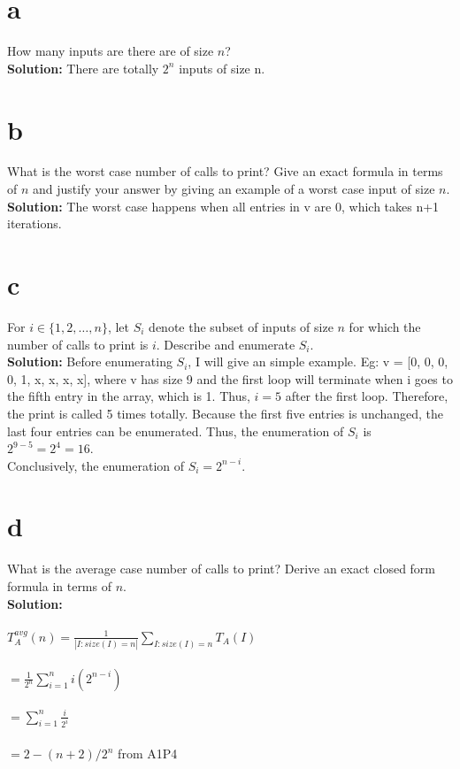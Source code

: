 \documentclass[12pt]{article}
\begin{document}
\begin{itemize}
\part{a} How many inputs are there are of size $n$?
\\\textbf{Solution: } There are totally $2^n$ inputs of size n.
\part{b} What is the worst case number of calls to print?  Give an
exact formula in terms of $n$ and justify your answer by giving an
example of a worst case input of size $n$.
\\\textbf{Solution: }The worst case happens when all entries in v are 0, which takes n+1 iterations. 
\part{c} For $i \in \{1,2,\ldots,n\}$, let $S_i$ denote the subset
of inputs of size $n$ for which the number of calls to print is
$i$.  Describe  and enumerate  $S_i$.
\\\textbf{Solution: }
Before enumerating $S_i$, I will give an simple example. Eg: v = [0, 0, 0, 0, 1, x, x, x, x], where v has size 9 and the first loop will terminate when i goes to the fifth entry in the array, which is 1. Thus, $i = 5$ after the first loop. Therefore, the print is called 5 times totally. Because the first five entries is unchanged, the last four entries can be enumerated. Thus, the enumeration of $S_i$ is $2^{9-5} = 2^4 = 16$.
\\Conclusively, the enumeration of \textbf{$S_i = 2^{n-i}$}.
\part{d} What is the average case number of calls to print?  Derive
an exact closed form formula in terms of $n$.
\\\textbf{Solution: }
\\
\\$T_{A}^{avg}(n) = \frac{1}{|{I:size(I) = n}|}\sum_{I:size(I) = n} T_A(I)$
\\
\\$=\frac{1}{2^n} \sum_{i = 1}^{n} i(2^{n-i})$
\\
\\$=\sum_{i=1}^{n} \frac{i}{2^i}$
\\
\\$=2-(n+2)/2^n$ from A1P4
\end{itemize}
\end{document}
